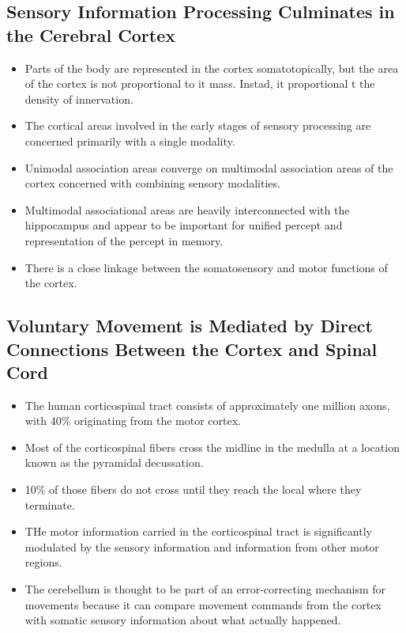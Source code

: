 \documentclass[12pt,a4paper]{article}
\begin{document}
\subsection{Sensory Information Processing Culminates in the Cerebral Cortex}
\begin{itemize}
    \item  Parts of the body are represented in the cortex somatotopically, but the area of the cortex is not proportional to it mass. Instad, it proportional t the density of innervation.
    \item The cortical areas involved in the early stages of sensory processing are concerned primarily with a single modality. 
    \item Unimodal association areas converge on multimodal association areas of the cortex concerned with combining sensory modalities.
    \item Multimodal associational areas are heavily interconnected with the hippocampus and appear to be important for unified percept and representation of the percept in memory.
    \item There is a close linkage between the somatosensory and motor functions of the cortex.
\end{itemize}

\subsection{Voluntary Movement is Mediated by Direct Connections Between the Cortex and Spinal Cord}
\begin{itemize}
    \item The human corticospinal tract consists of approximately one million axons, with 40\% originating from the motor cortex.
    \item Most of the corticospinal fibers cross the midline in the medulla at a location known as the pyramidal decussation.
    \item 10\% of those fibers do not cross until they reach the local where they terminate.
    \item THe motor information carried in the corticospinal tract is significantly modulated by the sensory information and information from other motor regions.
    \item The cerebellum is thought to be part of an error-correcting mechanism for movements because it can compare movement commands from the cortex with somatic sensory information about what actually happened.
\end{itemize}
\end{document}
